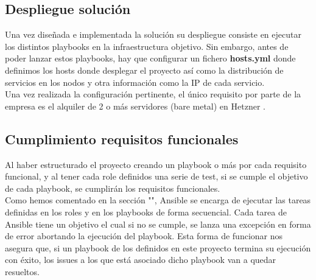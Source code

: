 \subsection{Despliegue solución}
\begin{text}
	Una vez diseñada e implementada la solución su despliegue consiste en ejecutar los distintos playbooks en la infraestructura objetivo. Sin embargo, antes de poder lanzar estos playbooks, hay que configurar un fichero \textbf{hosts.yml} donde definimos los hosts donde desplegar el proyecto así como la distribución de servicios en los nodos y otra información como la IP de cada servicio. \\
	Una vez realizada la configuración pertinente, el único requisito por parte de la empresa es el alquiler de 2 o más servidores (bare metal) en Hetzner \cite{hetzner:online}.
\end{text}

\subsection{Cumplimiento requisitos funcionales}
\begin{text}
	Al haber estructurado el proyecto creando un playbook o más por cada requisito funcional, y al tener cada role definidos una serie de test, si se cumple el objetivo de cada playbook, se cumplirán los requisitos funcionales. \\
	Como hemos comentado en la sección "", Ansible se encarga de ejecutar las tareas definidas en los roles y en los playbooks de forma secuencial. Cada tarea de Ansible tiene un objetivo el cual si no se cumple, se lanza una excepción en forma de error abortando la ejecución del playbook. Esta forma de funcionar nos asegura que, si un playbook de los definidos en este proyecto termina su ejecución con éxito, los issues a los que está asociado dicho playbook van a quedar resueltos.
\end{text}



